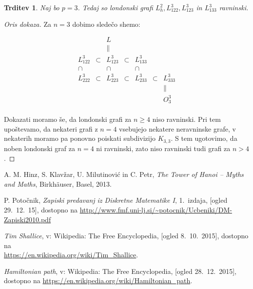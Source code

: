 \documentclass[11pt,a4paper]{article}
\theoremstyle{definition} %
\theoremstyle{plain} %
\newtheorem{trditev}[definicija]{Trditev}
\begin{document}
\begin{trditev}
    Naj bo $p=3$. Tedaj so londonski grafi $L_h^2, L_{122}^3,L_{123}^3$ in $ L_{133}^3$ ravninski.
\end{trditev}
\begin{proof}[Oris dokaza]
    Za $n=3$ dobimo sledečo shemo:
    
    \[
    \begin{matrix}
    & & L & & & & \\
    & & \parallel & & & & \\
    L_{122}^3 & \subset & L_{123}^3 & \subset & L_{133}^3 & & \\
    \cap & & \cap & & \cap & & \\
    L_{222}^3 & \subset & L_{223}^3 & \subset & L_{233}^3 & \subset & L_{333}^3 \\
    & & & & & & \parallel \\
    & & & & & & O^3_3 \\
    \end{matrix}
    \]
    
    Dokazati moramo še, da londonski grafi za $n \geq 4$ niso ravninski. Pri tem upoštevamo, da nekateri grafi z $n = 4$ vsebujejo nekatere neravninske grafe, v nekaterih moramo pa ponovno poiskati subdivizijo $K_{3,3}$. S tem ugotovimo, da noben londonski graf za $n=4$ ni ravninski, zato niso ravninski tudi grafi za $n>4$.
\end{proof}

\begin{thebibliography}{99}

 A. M. Hinz, S. Klavžar, U. Milutinović in C. Petr, \emph{The Tower of Hanoi – Myths and Maths}, Birkhäuser, Basel, 2013.

 P. Potočnik, \emph{Zapiski predavanj iz Diskretne Matematike I}, 1.~izdaja, [ogled 29.~12.~15], dostopno na \url{http://www.fmf.uni-lj.si/~potocnik/Ucbeniki/DM-Zapiski2010.pdf}

 \emph{Tim Shallice}, v: Wikipedia: The Free Encyclopedia, [ogled 8.~10.~2015], dostopno na\\ \url{https://en.wikipedia.org/wiki/Tim_Shallice}.

 \emph{Hamiltonian path}, v: Wikipedia: The Free Encyclopedia, [ogled 28.~12.~2015], dostopno na \url{https://en.wikipedia.org/wiki/Hamiltonian_path}.
\end{thebibliography}
\end{document}
